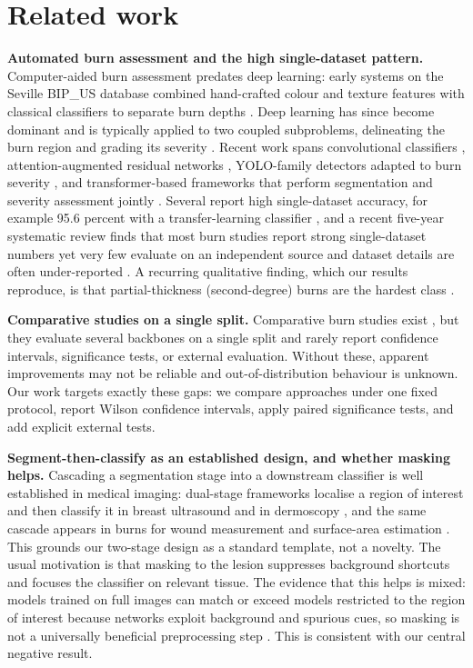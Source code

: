 \documentclass{elektr}
\begin{document}
\section{Related work}
\label{Rel}
\textbf{Automated burn assessment and the high single-dataset pattern.} Computer-aided burn assessment predates deep learning: early systems on the Seville BIP\_US database combined hand-crafted colour and texture features with classical classifiers to separate burn depths \cite{acha}. Deep learning has since become dominant and is typically applied to two coupled subproblems, delineating the burn region and grading its severity \cite{boissin}. Recent work spans convolutional classifiers \cite{suha}, attention-augmented residual networks \cite{yadav2023}, YOLO-family detectors adapted to burn severity \cite{ferdinand,yildiz}, and transformer-based frameworks that perform segmentation and severity assessment jointly \cite{nadeem}. Several report high single-dataset accuracy, for example 95.6 percent with a transfer-learning classifier \cite{suha}, and a recent five-year systematic review finds that most burn studies report strong single-dataset numbers yet very few evaluate on an independent source and dataset details are often under-reported \cite{fu2026review}. A recurring qualitative finding, which our results reproduce, is that partial-thickness (second-degree) burns are the hardest class \cite{nadeem,yildiz}.

\textbf{Comparative studies on a single split.} Comparative burn studies exist \cite{rahman,chang2023}, but they evaluate several backbones on a single split and rarely report confidence intervals, significance tests, or external evaluation. Without these, apparent improvements may not be reliable and out-of-distribution behaviour is unknown. Our work targets exactly these gaps: we compare approaches under one fixed protocol, report Wilson confidence intervals, apply paired significance tests, and add explicit external tests.

\textbf{Segment-then-classify as an established design, and whether masking helps.} Cascading a segmentation stage into a downstream classifier is well established in medical imaging: dual-stage frameworks localise a region of interest and then classify it in breast ultrasound \cite{bruno} and in dermoscopy \cite{almasni2020}, and the same cascade appears in burns for wound measurement and surface-area estimation \cite{chang2021}. This grounds our two-stage design as a standard template, not a novelty. The usual motivation is that masking to the lesion suppresses background shortcuts and focuses the classifier on relevant tissue. The evidence that this helps is mixed: models trained on full images can match or exceed models restricted to the region of interest because networks exploit background and spurious cues, so masking is not a universally beneficial preprocessing step \cite{sourget}. This is consistent with our central negative result.
\end{document}
